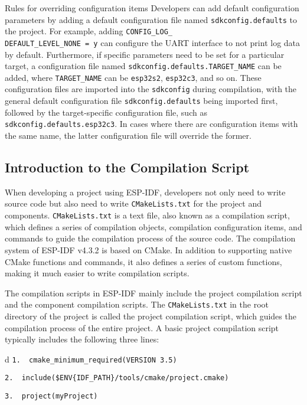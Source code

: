 \documentclass[a4paper,12pt]{book}
\begin{document}
\begin{term}{Rules for overriding configuration items}
    Developers can add default configuration parameters by adding a default configuration file named \verb|sdkconfig.defaults| to the project. For example, adding \verb|CONFIG_LOG_|\\ \verb|DEFAULT_LEVEL_NONE = y| can configure the UART interface to not print log data by default. Furthermore, if specific parameters need to be set for a particular target, a configuration file named \verb|sdkconfig.defaults.TARGET_NAME| can be added, where \verb|TARGET_NAME| can be \verb|esp32s2|, \verb|esp32c3|, and so on. These configuration files are imported into the \verb|sdkconfig| during compilation, with the general default configuration file \verb|sdkconfig.defaults| being imported first, followed by the target-specific configuration file, such as \verb|sdkconfig.defaults.esp32c3|. In cases where there are configuration items with the same name, the latter configuration file will override the former.
\end{term}

\subsection{Introduction to the Compilation Script}
When developing a project using ESP-IDF, developers not only need to write source code but also need to write \verb|CMakeLists.txt| for the project and components. \verb|CMakeLists.txt| is a text file, also known as a compilation script, which defines a series of compilation objects, compilation configuration items, and commands to guide the compilation process of the source code. The compilation system of ESP-IDF v4.3.2 is based on CMake. In addition to supporting native CMake functions and commands, it also defines a series of custom functions, making it much easier to write compilation scripts.

The compilation scripts in ESP-IDF mainly include the project compilation script and the component compilation scripts. The \verb|CMakeLists.txt| in the root directory of the project is called the project compilation script, which guides the compilation process of the entire project. A basic project compilation script typically includes the following three lines:

\begin{codebloc}
\begin{tabular}{d}
\verb|1.  cmake_minimum_required(VERSION 3.5)|

\verb|2.  include($ENV{IDF_PATH}/tools/cmake/project.cmake)|

\verb|3.  project(myProject)|
\end{tabular}
\end{codebloc}
\end{document}

